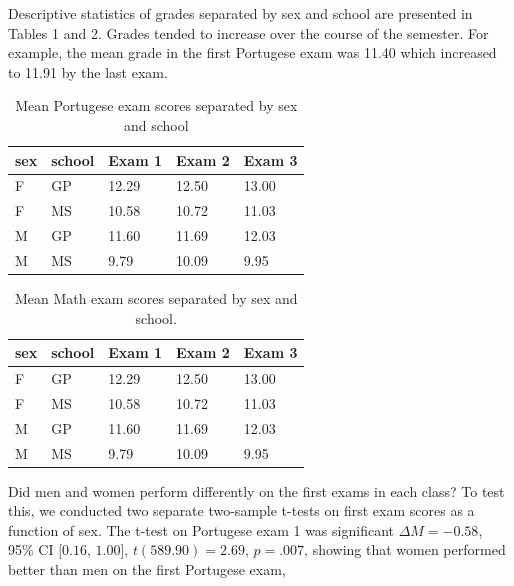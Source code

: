 \documentclass[english,floatsintext,man]{apa6}
\theoremstyle{definition}
\theoremstyle{definition}
\theoremstyle{definition}
\theoremstyle{remark}
\begin{document}
Descriptive statistics of grades separated by sex and school are
presented in Tables 1 and 2. Grades tended to increase over the course
of the semester. For example, the mean grade in the first Portugese exam
was 11.40 which increased to 11.91 by the last exam.

\begin{table}[tbp]
\begin{center}
\begin{threeparttable}
\caption{\label{tab:tbl1}Mean Portugese exam scores separated by sex and school}
\begin{tabular}{lllll}
\toprule
sex & \multicolumn{1}{c}{school} & \multicolumn{1}{c}{Exam 1} & \multicolumn{1}{c}{Exam 2} & \multicolumn{1}{c}{Exam 3}\\
\midrule
F & GP & 12.29 & 12.50 & 13.00\\
F & MS & 10.58 & 10.72 & 11.03\\
M & GP & 11.60 & 11.69 & 12.03\\
M & MS & 9.79 & 10.09 & 9.95\\
\bottomrule
\end{tabular}
\end{threeparttable}
\end{center}
\end{table}

\begin{table}[tbp]
\begin{center}
\begin{threeparttable}
\caption{\label{tab:tbl2}Mean Math exam scores separated by sex and school.}
\begin{tabular}{lllll}
\toprule
sex & \multicolumn{1}{c}{school} & \multicolumn{1}{c}{Exam 1} & \multicolumn{1}{c}{Exam 2} & \multicolumn{1}{c}{Exam 3}\\
\midrule
F & GP & 12.29 & 12.50 & 13.00\\
F & MS & 10.58 & 10.72 & 11.03\\
M & GP & 11.60 & 11.69 & 12.03\\
M & MS & 9.79 & 10.09 & 9.95\\
\bottomrule
\end{tabular}
\end{threeparttable}
\end{center}
\end{table}

Did men and women perform differently on the first exams in each class?
To test this, we conducted two separate two-sample t-tests on first exam
scores as a function of sex. The t-test on Portugese exam 1 was
significant \(\Delta M = -0.58\), 95\% CI \([0.16\), \(1.00]\),
\(t(589.90) = 2.69\), \(p = .007\), showing that women performed better
than men on the first Portugese exam,
\end{document}

